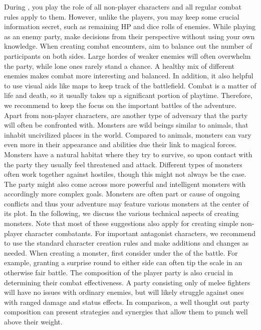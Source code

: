 %
\vfill
%
During , you play the role of all non-player characters and all regular combat rules apply to them. 
However, unlike the players, you may keep some crucial information secret, such as remaining HP and dice rolls of enemies.
While playing as an enemy party, make decisions from their perspective without using your own knowledge.
When creating combat encounters, aim to balance out the number of participants on both sides.
Large hordes of weaker enemies will often overwhelm the party, while lone ones rarely stand a chance.
A healthy mix of different enemies makes combat more interesting and balanced.
In addition, it also helpful to use visual aids like maps to keep track of the battlefield.
Combat is a matter of life and death, so it usually takes up a significant portion of playtime.
Therefore, we recommend to keep the focus on the important battles of the adventure.   
%
\vfill
%
Apart from non-player characters,  are another type of adversary that the party will often be confronted with. 
Monsters are wild beings similar to animals, that inhabit uncivilized places in the world.
Compared to animals, monsters can vary even more in their appearance and abilities due their link to magical forces.
Monsters have a natural habitat where they try to survive, so upon contact with the party they usually feel threatened and attack.
Different types of monsters often work together against hostiles, though this might not always be the case.
The party might also come across more powerful and intelligent monsters with accordingly more complex goals.
Monsters are often part or cause of ongoing conflicts and thus your adventure may feature various monsters at the center of its plot. 
In the following, we discuss the various technical aspects of creating monsters.
Note that most of these suggestions also apply for creating simple non-player character combatants. 
For important antagonist characters, we recommend to use the standard character creation rules and make additions and changes as needed.
%
\newpage
%
When creating a monster, first consider under the  of the battle.
For example, granting a surprise round to either side can often tip the scale in an otherwise fair battle.
The composition of the player party is also crucial in determining their combat effectiveness.
A party consisting only of melee fighters will have no issues with ordinary enemies, but will likely struggle against ones with ranged damage and status effects.
In comparison, a well thought out party composition can present strategies and synergies that allow them to punch well above their weight.
